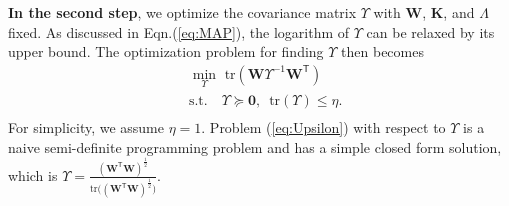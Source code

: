 \documentclass[10pt,journal,compsoc]{IEEEtran}
\newcommand{\W} {\textbf{W}}
\newcommand{\K} {\textbf{K}}
\newcommand{\trans}[1]{{#1}^{\ensuremath{\mathsf{T}}}}
\begin{document}
\vspace{0.1cm}
\textbf{In the second step}, we optimize the covariance matrix $\Upsilon$ with $\W$, $\K$, and $\Lambda$ fixed. As discussed in Eqn.(\ref{eq:MAP}), the logarithm of $\Upsilon$ can be relaxed by its upper bound. The optimization problem for finding $\Upsilon$ then becomes
\begin{equation}\label{eq:Upsilon}
\begin{split}
&\min_{\Upsilon} \,\, \textrm{tr}(\W\Upsilon^{-1}\trans{\W})\\
&\textrm{s.t.}\,\,\,\,\,\,\Upsilon\succeq\textbf{0}, \,\,\,\textrm{tr}(\Upsilon)\leq\eta.\\
\end{split}
\end{equation}
For simplicity, we assume $\eta=1$. Problem (\ref{eq:Upsilon}) with respect to $\Upsilon$ is a naive semi-definite programming problem and has a simple closed form solution, which is $\Upsilon=\frac{(\trans{\W}\W)^{\frac{1}{2}}}
{\mathrm{tr}\big((\trans{\W}\W)^{\frac{1}{2}}\big)}$.
\end{document}
